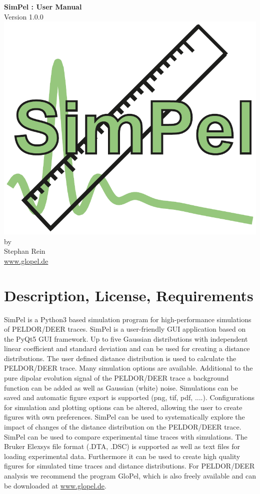 \documentclass[pdftex,bezier,german,a4,twoside, headexclude,12pt,nochapterprefix, titlepage]{extarticle}
\newcommand{\simpel}{\textsf{SimPel} }
\begin{document}
\thispagestyle{empty}
\begin{center}
\textbf{\Large \simpel: User Manual}\\[1.5cm]
{\large Version 1.0.0} \\[1.5cm]
\includegraphics[scale=0.65]{SimPel_Logo.pdf}\\[2cm]
by \\[0.5cm]
{\Large Stephan Rein}\\[1cm]
{\large \url{www.glopel.de}}
\end{center}
\newpage


\section{Description, License, Requirements}
\simpel is a Python3 based simulation program for high-performance simulations of PELDOR/DEER traces. \simpel is a user-friendly GUI application based on the PyQt5 GUI framework.
Up to five Gaussian distributions with independent
linear coefficient and standard deviation and can be used for creating a distance distributions. The user defined distance distribution
is used to calculate the PELDOR/DEER trace. Many simulation options are available. Additional to the pure dipolar evolution signal of the PELDOR/DEER trace a background function
can be added as well as Gaussian (white) noise. Simulations can be saved and automatic figure export is supported (png, tif, pdf, ....).
Configurations for simulation and plotting options can be altered, allowing the user to create figures with own preferences.
\simpel can be used to systematically explore the impact of changes of the distance distribution on the PELDOR/DEER trace.
\simpel can be used to compare experimental time traces with simulations. The Bruker Elexsys file format (.DTA, .DSC)
is supported as well as text files for loading experimental data. Furthermore it can be used to create high quality figures for 
simulated time traces and distance distributions.
For PELDOR/DEER analysis we recommend the program GloPel, which is also freely available and can be downloaded at {\url{www.glopel.de}}.
\end{document}
